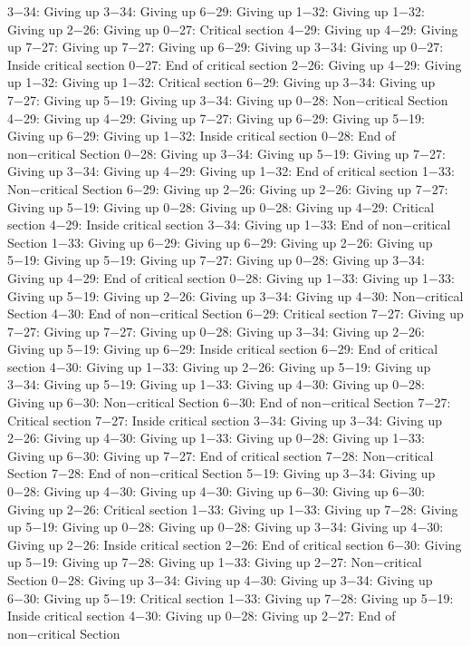 3−34: Giving up
3−34: Giving up
6−29: Giving up
1−32: Giving up
1−32: Giving up
2−26: Giving up
0−27: Critical section
4−29: Giving up
4−29: Giving up
7−27: Giving up
7−27: Giving up
6−29: Giving up
3−34: Giving up
0−27: Inside critical section
0−27: End of critical section
2−26: Giving up
4−29: Giving up
1−32: Giving up
1−32: Critical section
6−29: Giving up
3−34: Giving up
7−27: Giving up
5−19: Giving up
3−34: Giving up
0−28: Non−critical Section
4−29: Giving up
4−29: Giving up
7−27: Giving up
6−29: Giving up
5−19: Giving up
6−29: Giving up
1−32: Inside critical section
0−28: End of non−critical Section
0−28: Giving up
3−34: Giving up
5−19: Giving up
7−27: Giving up
3−34: Giving up
4−29: Giving up
1−32: End of critical section
1−33: Non−critical Section
6−29: Giving up
2−26: Giving up
2−26: Giving up
7−27: Giving up
5−19: Giving up
0−28: Giving up
0−28: Giving up
4−29: Critical section
4−29: Inside critical section
3−34: Giving up
1−33: End of non−critical Section
1−33: Giving up
6−29: Giving up
6−29: Giving up
2−26: Giving up
5−19: Giving up
5−19: Giving up
7−27: Giving up
0−28: Giving up
3−34: Giving up
4−29: End of critical section
0−28: Giving up
1−33: Giving up
1−33: Giving up
5−19: Giving up
2−26: Giving up
3−34: Giving up
4−30: Non−critical Section
4−30: End of non−critical Section
6−29: Critical section
7−27: Giving up
7−27: Giving up
7−27: Giving up
0−28: Giving up
3−34: Giving up
2−26: Giving up
5−19: Giving up
6−29: Inside critical section
6−29: End of critical section
4−30: Giving up
1−33: Giving up
2−26: Giving up
5−19: Giving up
3−34: Giving up
5−19: Giving up
1−33: Giving up
4−30: Giving up
0−28: Giving up
6−30: Non−critical Section
6−30: End of non−critical Section
7−27: Critical section
7−27: Inside critical section
3−34: Giving up
3−34: Giving up
2−26: Giving up
4−30: Giving up
1−33: Giving up
0−28: Giving up
1−33: Giving up
6−30: Giving up
7−27: End of critical section
7−28: Non−critical Section
7−28: End of non−critical Section
5−19: Giving up
3−34: Giving up
0−28: Giving up
4−30: Giving up
4−30: Giving up
6−30: Giving up
6−30: Giving up
2−26: Critical section
1−33: Giving up
1−33: Giving up
7−28: Giving up
5−19: Giving up
0−28: Giving up
0−28: Giving up
3−34: Giving up
4−30: Giving up
2−26: Inside critical section
2−26: End of critical section
6−30: Giving up
5−19: Giving up
7−28: Giving up
1−33: Giving up
2−27: Non−critical Section
0−28: Giving up
3−34: Giving up
4−30: Giving up
3−34: Giving up
6−30: Giving up
5−19: Critical section
1−33: Giving up
7−28: Giving up
5−19: Inside critical section
4−30: Giving up
0−28: Giving up
2−27: End of non−critical Section
